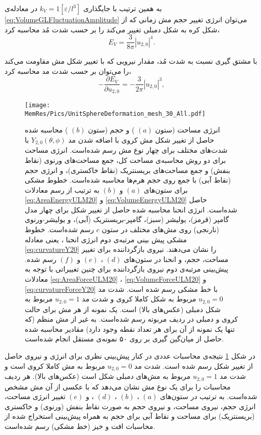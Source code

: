 به همین ترتیب با جایگذاری 
$k_V=1[\varepsilon/l^3]$
در معادله‌ی
\ref{eq:VolumeGLFluctuationAmplitude}
می‌توان انرژی تغییر حجم مش زمانی که از  شکل کره به شکل دمبلی تغییر می‌کند را بر حسب شدت مُد محاسبه کرد،
\begin{equation}
E_V= \frac{3}{8\pi}|u_{2,0}|^4.
\label{eq:VolumeEnergyULM20}
\end{equation}

با مشتق ‌گیری نسبت به شدت مُد، مقدار نیرویی که با تغییر شکل مش مقاومت می‌کند را می‌توان بر حسب شدت مد محاسبه کرد،
\begin{equation}
-\frac{\partial E_V}{\partial u_{2,0}}= -\frac{3}{2\pi}|u_{2,0}|^3,
\label{eq:VolumeForceULM20}
\end{equation}

\begin{figure}[tbp]
\begin{center}
\texttt{[image: \\MemRes/Pics/UnitSphereDeformation\_mesh\_30\_All.pdf]}
\caption{
انرژی مساحت (ستون 
$(a)$
) و حجم (ستون 
$(b)$
) محاسبه‌ شده حاصل از تغییر شکل مش کروی با اضافه شدن مد
$Y_{2,0}(\theta,\phi)$
با شدت‌های مختلف برای چهار نوع مش رسم شده‌است. انرژی مساحت برای دو روش محاسبه‌ی مساحت کل، جمع مساحت‌های ورنوی (نقاط بنفش) و جمع مساحت‌های بریسنتریک (نقاط خاکستری)، و انرژی حجم (نقاط آبی) با جمع روی حجم هرم‌ها محاسبه شده‌است. خطوط مشکی برای ستون‌های 
$(a)$
و
$(b)$
به ترتیب از رسم معادلات
\ref{eq:AreaEnergyULM20}
و
\ref{eq:VolumeEnergyULM20}
حاصل شده‌است. انرژی انحنا محاسبه‌ شده حاصل از تغییر شکل برای چهار مدل گامپر (قرمز)، یولیشر (سبز)، گامپر-بریسنتریک (آبی)، و یولیشر-ورنوی (نارنجی) روی مش‌های مختلف در ستون
$c$
 رسم شده‌است. خطوط مشکی پیش بینی
 مرتبه‌ی دوم انرژی انحنا ، یعنی معادله
\ref{eq:curvatureY20}
را نشان می‌دهند. نیروی بازگرداننده برای تغییر مساحت، حجم، و انحنا در ستون‌های 
$(d)$
،
$(e)$
و
$(f)$
رسم شده.  پیش‌بینی‌ مرتبه‌ی دوم نیروی بازگرداننده برای چنین تغییراتی با توجه به معادلات
\ref{eq:AreaForceULM20}
،
\ref{eq:VolumeForceULM20}
و
\ref{eq:curvatureForceY20}
با خط مشکی رسم شده است. شدت مد 
$u_{2,0}=0$
مربوط به شکل کاملا کروی و شدت مد 
$u_{2,0}=1$
مربوط به شکل دمبلی (عکس‌های بالا) است. یک نمونه از هر مش برای حالت کروی و دمبلی در ردیف مربوته رسم شده‌است. به غیر از مش منظم (که تنها یک نمونه از آن برای هر تعداد نقطه وجود دارد) مقادیر محاسبه شده حاصل از میان‌گین گیری بر روی ۵۰ نمونه‌ی مستقل انجام شده‌است.
}
\label{fig:AllULM20}
\end{center}
\end{figure}


در شکل
\ref{fig:AllULM20}
نتیجه‌ی محاسبات عددی در کنار پیش‌بینی نظری برای انرژی و نیروی حاصل از تغییر شکل رسم شده است. شدت مد
$u_{2,0}=0$
مربوط به مش کاملا کروی است و شدت مد 
$u_{2,0}=1$
مربوط به مش‌های دمبلی شکل است (عکس‌های بالا). هر ردیف محاسبات را برای یک نوع مش نشان می‌دهد که با  عکسی از آن مش مشخص شده‌است. به ترتیب در ستون‌های 
$(a)$
،
$(b)$
،
$(d)$
، و
$(e)$
تغییر انرژی مساحت، انرژی حجم، نیروی مساحت، و نیروی حجم به صورت نقاط بنفش (ورنوی) و خاکستری (بریسنتریک) برای مساحت و نقاط آبی برای حجم به همراه پیش‌بینی استخراج شده از محاسبات افت و خیز (خط مشکی) رسم شده‌است. 

